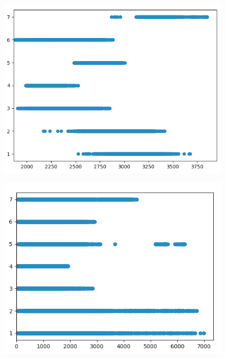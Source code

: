 \documentclass[a4paper, 11pt]{article}
\begin{document}
\begin{figure}[htb]
\centering
\begin{minipage}{.5\textwidth}
  \centering
  \includegraphics[width=\textwidth]{img/elevation}
  \label{elev}
\end{minipage}%
\begin{minipage}{.5\textwidth}
  \centering
  \includegraphics[width=\textwidth]{img/distance_to_fire_points}
  \label{fire}
\end{minipage}
\end{figure}
\end{document}
